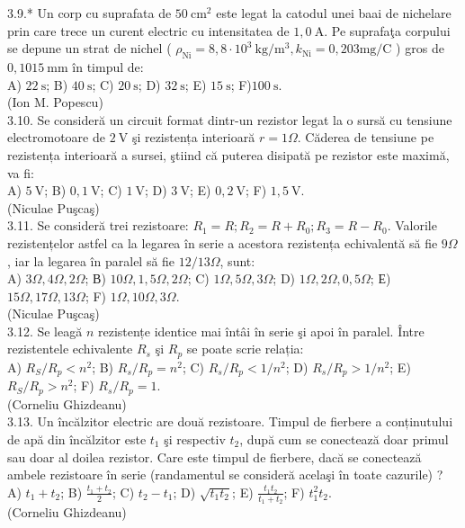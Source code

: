 \documentclass[10pt]{article}
\begin{document}
3.9.* Un corp cu suprafata de $50 \mathrm{~cm}^{2}$ este legat la catodul unei baai de nichelare prin care trece un curent electric cu intensitatea de $1,0 \mathrm{~A}$. Pe suprafaţa corpului se depune un strat de nichel ( $\rho_{\mathrm{Ni}}=8,8 \cdot 10^{3} \mathrm{~kg} / \mathrm{m}^{3}, k_{\mathrm{Ni}}=0,203 \mathrm{mg} / \mathrm{C}$ ) gros de $0,1015 \mathrm{~mm}$ în timpul de:\\ A) $22 \mathrm{~s}$; B) $40 \mathrm{~s}$; C) $20 \mathrm{~s}$; D) $32 \mathrm{~s}$; E) $15 \mathrm{~s}$; F)$100 \mathrm{~s}$.\\ (Ion M. Popescu)\\

3.10. Se consideră un circuit format dintr-un rezistor legat la o sursă cu tensiune electromotoare de $2 \mathrm{~V}$ şi rezistența interioară $r=1 \Omega$. Căderea de tensiune pe rezistența interioară a sursei, ştiind că puterea disipată pe rezistor este maximă, va fi:\\ A) $5 \mathrm{~V}$; B) $0,1 \mathrm{~V}$; C) $1 \mathrm{~V}$; D) $3 \mathrm{~V}$; E) $0,2 \mathrm{~V}$; F) $1,5 \mathrm{~V}$.\\ (Niculae Puşcaş)\\

3.11. Se consideră trei rezistoare: $R_{1}=R ; R_{2}=R+R_{0} ; R_{3}=R-R_{0}$. Valorile rezistențelor astfel ca la legarea în serie a acestora rezistența echivalentă să fie $9 \Omega$, iar la legarea în paralel să fie $12 / 13 \Omega$, sunt:\\ A) $3 \Omega , 4 \Omega , 2 \Omega$; В) $10 \Omega , 1,5 \Omega , 2 \Omega$; C) $1 \Omega , 5 \Omega , 3 \Omega$; D) $1 \Omega , 2 \Omega , 0,5 \Omega$; Е) $15 \Omega , 17 \Omega , 13 \Omega$; F) $1 \Omega , 10 \Omega , 3 \Omega$.\\ (Niculae Puşcaş)\\

3.12. Se leagă $n$ rezistențe identice mai întâi în serie şi apoi în paralel. Între rezistentele echivalente $R_{s}$ şi $R_{p}$ se poate scrie relația:\\ A) $R_{S} / R_{p}<n^{2}$; B) $R_{s} / R_{p}=n^{2}$; C) $R_{s} / R_{p}<1 / n^{2}$; D) $R_{s} / R_{p}>1 / n^{2}$; E) $R_{S} / R_{p}>n^{2}$; F) $R_{s} / R_{p}=1$.\\ (Corneliu Ghizdeanu)\\

3.13. Un încălzitor electric are două rezistoare. Timpul de fierbere a conținutului de apă din încălzitor este $t_{1}$ şi respectiv $t_{2}$, după cum se conectează doar primul sau doar al doilea rezistor. Care este timpul de fierbere, dacă se conectează ambele rezistoare în serie (randamentul se consideră acelaşi în toate cazurile) ?\\ A) $t_{1}+t_{2}$; B) $\frac{t_{1}+t_{2}}{2}$; C) $t_{2}-t_{1}$; D) $\sqrt{t_{1} t_{2}}$; E) $\frac{t_{1} t_{2}}{t_{1}+t_{2}}$; F) $t_{1}^{2} t_{2}$.\\ (Corneliu Ghizdeanu)\\
\end{document}
